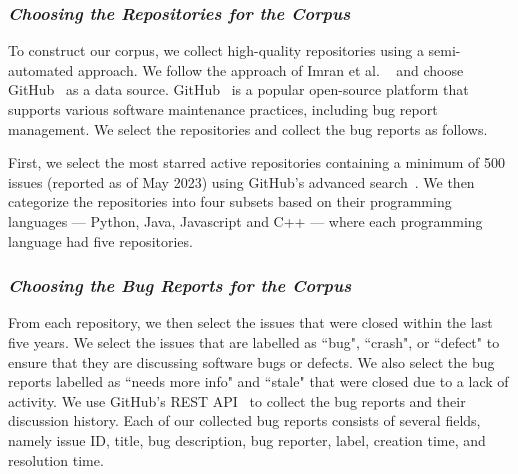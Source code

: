 \subsubsection{\textit{Choosing the Repositories for the Corpus}}
\label{sec:proposedtechnique-repo}
To construct our corpus, we collect high-quality repositories using a semi-automated approach. We follow the approach of Imran et al. ~\cite{imran2021automatically} and choose GitHub~\cite{github} as a data source. GitHub~\cite{github} is a popular open-source platform that supports various software maintenance practices, including bug report management. We select the repositories and collect the bug reports as follows.\par

First, we select the most starred active repositories containing a minimum of 500 issues (reported as of May 2023) using GitHub's advanced search~\cite{GitHubAdvancedSearch}. We then categorize the repositories into four subsets based on their programming languages --- Python, Java, Javascript and C++ --- where each programming language had five repositories.\par

\subsubsection{\textit{Choosing the Bug Reports for the Corpus}}
From each repository, we then select the issues that were closed within the last five years. We select the issues that are labelled as ``bug", ``crash", or ``defect" to ensure that they are discussing software bugs or defects. We also select the bug reports labelled as ``needs more info" and ``stale" that were closed due to a lack of activity. We use GitHub's REST API~\cite{githubdocumentation} to collect the bug reports and their discussion history. Each of our collected bug reports consists of several fields, namely issue ID, title, bug description, bug reporter, label, creation time, and resolution time. \par

